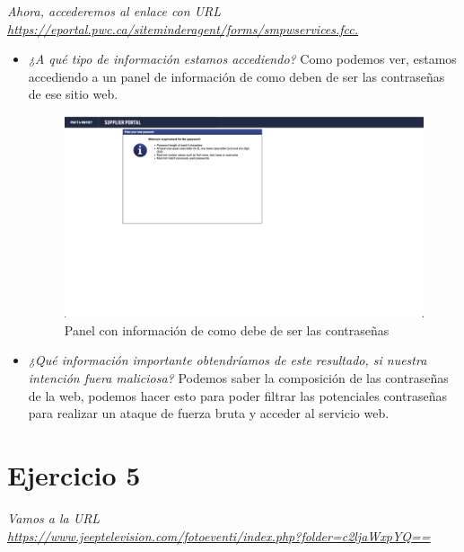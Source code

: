 \documentclass[12pt]{book}
\begin{document}
\textit{Ahora, accederemos al enlace con
URL \url{https://eportal.pwc.ca/siteminderagent/forms/smpwservices.fcc.}}
\begin{itemize}
    \item \textit{¿A qué tipo de información estamos accediendo?}
    \newline
    Como podemos ver, estamos accediendo a un panel de información de como deben de ser las contraseñas de ese sitio web.
    \begin{figure}[h]
        \centering
        \includegraphics[width=\linewidth]{Practica 3y4/images/Screenshot 2024-10-24 at 10.12.21.png}
        \caption{Panel con información de como debe de ser las contraseñas}
        \label{fig:enter-label}
    \end{figure}
    \item \textit{¿Qué información importante obtendríamos de este resultado, si nuestra intención fuera maliciosa?}
    Podemos saber la composición de las contraseñas de la web, podemos hacer esto para poder filtrar las potenciales contraseñas para realizar un ataque de fuerza bruta y acceder al servicio web.
    \newline
\end{itemize}
\section{Ejercicio 5}

\textit{Vamos a la URL\\ \url{https://www.jeeptelevision.com/fotoeventi/index.php?folder=c2ljaWxpYQ==}}
\end{document}
